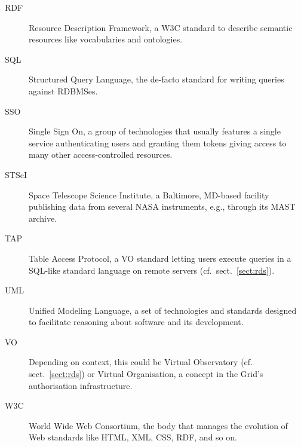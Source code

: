 \begin{description}
\item[RDF] Resource Description Framework, a W3C standard to describe
semantic resources like vocabularies and ontologies.

\item[SQL] Structured Query Language, the de-facto standard for writing
queries against RDBMSes.

\item[SSO] Single Sign On, a group of technologies that usually features
a single service authenticating users and granting them tokens giving
access to many other access-controlled resources.

\item[STScI] Space Telescope Science Institute, a Baltimore, MD-based
facility publishing data from several NASA instruments, e.g., through
its MAST archive.

\item[TAP] Table Access Protocol, a VO standard letting users execute
queries in a SQL-like standard language on remote servers
(cf.~sect.~\ref{sect:rds}).

\item[UML] Unified Modeling Language, a set of technologies and standards
designed to facilitate reasoning about software and its development.

\item[VO] Depending on context, this could be Virtual Observatory (cf.
sect.~\ref{sect:rds}) or Virtual Organisation, a concept in the Grid's
authorisation infrastructure.

\item[W3C] World Wide Web Consortium, the body that manages the
evolution of Web standards like HTML, XML, CSS, RDF, and so on.
\end{description}
